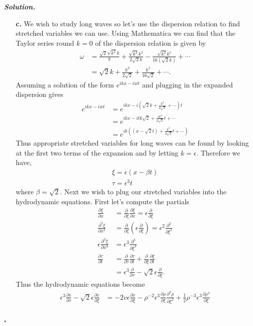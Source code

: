 \documentclass[12pt]{report}
\newenvironment{solution}[1][\it{Solution}]{\textbf{#1. } }{$\square$}
\def\eps{{\epsilon}}
\newcommand{\paren}[1]{{\left(#1\right)}} %
\newcommand{\pp}[2]{\frac{\partial #1}{\partial #2}} %
\newcommand{\ppn}[3]{\frac{\partial^{#1} #2}{\partial #3^{#1}}} %
\begin{document}
\begin{solution}
\begin{enumerate}
        \item[{\bf c.}] 
        We wish to study long waves so let's use the dispersion relation to find stretched variables we can use. Using Mathematica we can find that the Taylor series round $k=0$ of the dispersion relation is given by
        \begin{align*}
            \omega &= \frac{\sqrt{2}\sqrt{k^2}k}{k} + \frac{\sqrt{k^2}k^3}{2\sqrt{2}k} - \frac{\sqrt{k^2}k^5}{16(\sqrt{2}k)} + \cdots\\
            &= \sqrt{2}k + \frac{k^3}{2\sqrt{2}} + \frac{k^5}{16\sqrt{2}} + \cdots.
        \end{align*} 
        Assuming a solution of the form $e^{ikx - iwt}$ and plugging in the expanded dispersion gives
        \begin{align*}
            e^{ikx - iwt} &= e^{ikx - i(\sqrt{2}k + \frac{k^3}{2\sqrt{2}} + \cdots)t}\\
            &= e^{ikx - itk\sqrt{2} + \frac{ik^3}{2\sqrt{2}}t + \cdots}\\
            &= e^{ik\paren{(x - \sqrt{2}t) + \frac{k^2}{2\sqrt{2}}t + \cdots}}
        \end{align*}
        Thus appropriate stretched variables for long waves can be found by looking at the first two terms of the expansion and by letting $k=\eps$. Therefore we have,
        \begin{align*}
            \xi = \eps(x - \beta t)\\
            \tau = \eps^3 t
        \end{align*}
        where $\beta = \sqrt{2}$. 
        Next we wish to plug our stretched variables into the hydrodynamic equations. First let's compute the partials
        \begin{align*}
            \pp{\xi}{x} &=\pp{}{\xi}\pp{\xi}{x} = \eps \pp{}{\xi}\\
            \ppn{2}{\xi}{x} &= \pp{}{\xi}\paren{\eps \pp{}{\xi}} = \eps^2\ppn{2}{}{\xi}\\
            \eps\ppn{3}{\xi}{x} &= \eps^3 \ppn{3}{}{\xi}\\
            \pp{\tau}{t} &= \pp{}{\tau}\pp{\tau}{t} + \pp{}{\xi} \pp{\xi}{t}\\
            &= \eps^3 \pp{}{\tau} - \sqrt{2} \eps \pp{}{\xi}.
        \end{align*}
        Thus the hydrodynamic equations become
        \begin{align*}
            \eps^3 \pp{v}{\tau} - \sqrt{2} \eps \pp{v}{\xi} &= -2v\eps\pp{v}{\xi} - \rho^{-2}\eps^3\pp{\rho}{\xi}\ppn{2}{\rho}{\xi} + \frac{1}{2}\rho^{-3}\eps^3\pp{\rho^3}{\xi}\\

\end{align*}
\end{enumerate}
\end{solution}
\end{document}
